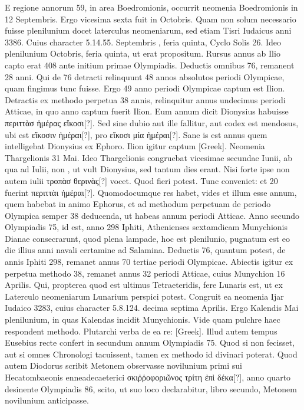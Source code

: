 E regione annorum 59, in area Boedromionis,
occurrit neomenia Boedromionis in 12 Septembris.
Ergo vicesima
sexta fuit in  Octobris.
Quam non solum necessario fuisse
plenilunium docet laterculus neomeniarum, sed etiam Tisri Iudaicus
anni 3386.
Cuius character 5.14.55. Septembris , feria quinta,
Cyclo Solis 26.
Ideo plenilunium  Octobris, feria quinta, ut
erat propositum.
Rursus annus ab Ilio capto erat 408 ante initium
primae Olympiadis.
Deductis omnibus 76, remanent 28 anni.
Qui de 76 detracti relinquunt 48 annos absolutos periodi Olympicae,
quam fingimus tunc fuisse.
Ergo 49 anno periodi Olympicae captum
est Ilion.
Detractis ex methodo perpetua 38 annis, relinquitur annus
undecimus periodi Atticae, in quo anno captum fuerit Ilion.
Eum
annum dicit Dionysius habuisse \textgreek{περιττὰσ ἡμέρας εἴκοσι[?]}.
Sed sine dubio
aut ille fallitur, aut codex est mendosus, ubi est
 \textgreek{εἴκοσιν ἡμέραι[?]}, pro
\textgreek{εἴκοσι μία ἡμέραι[?]}.
Sane is est annus quem intelligebat Dionysius ex
Ephoro.
Ilion igitur captum \textgreek{[Greek]}.
Neomenia Thargelionis 31 Mai.
Ideo  Thargelionis congruebat vicesimae
secundae Iunii, ab qua ad  Iulii, non ,
 ut vult Dionysius,
sed  tantum dies erant.
Nisi forte ipse  non autem  iulii
\textgreek{τροπὰσ θερινὰς[?]} vocet.
Quod fieri potest.
Tunc conveniet: et 20 fuerint
\textgreek{περιττὰι ἡμέραι[?]}.
Quomodocumque res habet, vides et illum esse
annum, quem habebat in animo Ephorus, et ad methodum perpetuam
de periodo Olympica semper 38 deducenda, ut habeas annum
periodi Atticae.
Anno secundo Olympiadis 75, id est, anno 298 Iphiti,
Athenienses sextamdicam Munychionis Dianae consecrarunt,
quod plena lampade, hoc est plenilunio, pugnatum est eo die illius
anni navali certamine ad Salamina.
Deductis 76, quantum potest,
de annis Iphiti 298, remanet annus 70 tertiae periodi Olympicae.
Abiectis igitur ex perpetua methodo 38, remanet annus 32 periodi
Atticae, cuius Munychion 16 Aprilis.
Qui, propterea quod est ultimus
Tetraeteridis, fere Lunaris est, ut ex Laterculo neomeniarum
Lunarium perspici potest.
Congruit ea neomenia Ijar Iudaico 3283,
cuius character 5.8.124. decima septima Aprilis.
Ergo Kalendis
Mai plenilunium, in quas Kalendas incidit  Munychionis.
Vide quam pulchre haec respondent methodo.
Plutarchi verba de
ea re: \textgreek{[Greek]}.
Illud autem tempus Eusebius
recte confert in secundum annum Olympiadis 75.
Quod
si non fecisset, aut si omnes Chronologi tacuissent, tamen ex methodo
id divinari poterat.
Quod autem Diodorus scribit Metonem
observasse novilunium primi sui Hecatombaeonis enneadecaeterici
\textgreek{σκιῤῥοφοριῶνος τρίτη ἐπὶ δέκα[?]}, anno quarto desinente
 Olympiadis 86,
scito, ut suo loco declarabitur, libro secundo, Metonem novilunium
anticipasse.

